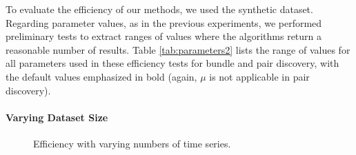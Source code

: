 \label{subsubsec:effic}
To evaluate the efficiency of our methods, we used the synthetic dataset. Regarding parameter values, as in the previous experiments, we performed preliminary tests to extract ranges of values where the algorithms return a reasonable number of results. Table \ref{tab:parameters2} lists the range of values for all parameters used in these efficiency tests for bundle and pair discovery, with the default values emphasized in bold (again, $\mu$ is not applicable in pair discovery).


\paragraph{Varying Dataset Size}
\begin{figure}[tb]
 \centering
 \caption{Efficiency with varying numbers of time series.}
 \label{fig:exp4}
\end{figure}

